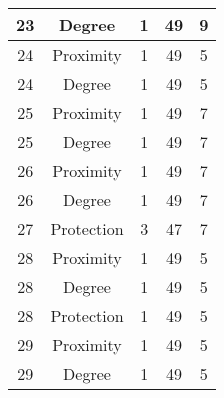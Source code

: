 \documentclass[results.tex]{subfiles}
\begin{document}
\begin{center}
\begin{tabular}{| c || c | c | c | c |}
            \hline
            23                      & Degree                       & 1                      & 49                      & 9                    \\
            \hline
            24                      & Proximity                    & 1                      & 49                      & 5                    \\
            \hline
            24                      & Degree                       & 1                      & 49                      & 5                    \\
            \hline
            25                      & Proximity                    & 1                      & 49                      & 7                    \\
            \hline
            25                      & Degree                       & 1                      & 49                      & 7                    \\
            \hline
            26                      & Proximity                    & 1                      & 49                      & 7                    \\
            \hline
            26                      & Degree                       & 1                      & 49                      & 7                    \\
            \hline
            27                      & Protection                   & 3                      & 47                      & 7                    \\
            \hline
            28                      & Proximity                    & 1                      & 49                      & 5                    \\
            \hline
            28                      & Degree                       & 1                      & 49                      & 5                    \\
            \hline
            28                      & Protection                   & 1                      & 49                      & 5                    \\
            \hline
            29                      & Proximity                    & 1                      & 49                      & 5                    \\
            \hline
            29                      & Degree                       & 1                      & 49                      & 5                    \\

\end{tabular}
\end{center}
\end{document}

